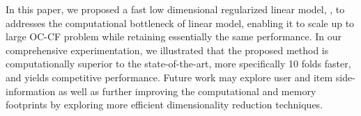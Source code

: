 
In this paper, we proposed a fast low dimensional regularized linear model, \LinearLow, to addresses the computational bottleneck of linear model, enabling it to scale up to large OC-CF problem while retaining essentially the same performance. In our comprehensive experimentation, we illustrated that the proposed method is computationally superior to the state-of-the-art, more specifically 10 folds faster, and yields competitive performance. Future work may explore user and item side-information as well as further improving the computational and memory footprints by exploring more efficient dimensionality reduction techniques.